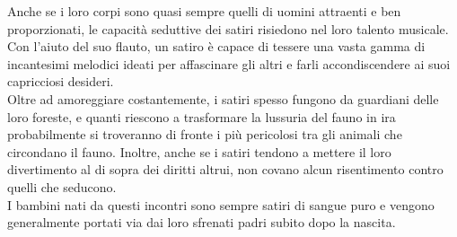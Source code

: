 \begin{multicols}{2}
Anche se i loro corpi sono quasi sempre quelli di uomini attraenti e ben proporzionati, le capacità seduttive dei satiri risiedono nel loro talento musicale. Con l'aiuto del suo flauto, un satiro è capace di tessere una vasta gamma di incantesimi melodici ideati per affascinare gli altri e farli accondiscendere ai suoi capricciosi desideri.\\

Oltre ad amoreggiare costantemente, i satiri spesso fungono da guardiani delle loro foreste, e quanti riescono a trasformare la lussuria del fauno in ira probabilmente si troveranno di fronte i più pericolosi tra gli animali che circondano il fauno. Inoltre, anche se i satiri tendono a mettere il loro divertimento al di sopra dei diritti altrui, non covano alcun risentimento contro quelli che seducono.\\

I bambini nati da questi incontri sono sempre satiri di sangue puro e vengono generalmente portati via dai loro sfrenati padri subito dopo la nascita.\\


\end{multicols}
